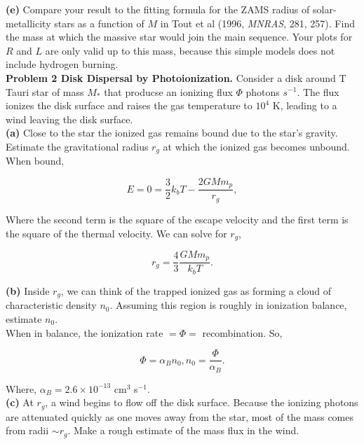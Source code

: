 \documentclass[12pt]{article}
\begin{document}
\noindent \textbf{(e)} Compare your result to the fitting formula for the ZAMS radius of solar-metallicity stars as a function of $M$ in Tout et al (1996, {\it MNRAS}, 281, 257). Find the mass at which the massive star would join the main sequence. Your plots for $R$ and $L$ are only valid up to this mass, because this simple models does not include hydrogen burning. \\


\noindent \textbf{Problem 2 Disk Dispersal by Photoionization.} Consider a disk around T Tauri star of mass $M_*$ that producse an ionizing flux $\Phi$ photons $s^{-1}$. The flux ionizes the disk surface and raises the gas temperature to $10^4$ K, leading to a wind leaving the disk surface.\\

\noindent \textbf{(a)} Close to the star the ionized gas remains bound due to the star's gravity. Estimate the gravitational radius $r_g$ at which the ionized gas becomes unbound. \\

\noindent When bound, 

\begin{equation}
E = 0 = \frac{3}{2}k_bT -\frac{2GMm_p}{r_g},
\end{equation}

\noindent Where the second term is the square of the escape velocity and the first term is the square of the thermal velocity. We can solve for $r_g$,

\begin{equation}
r_{g} = \frac{4}{3}\frac{GMm_p}{k_bT}.
\end{equation}

\noindent \textbf{(b)} Inside $r_g$, we can think of the trapped ionized gas as forming a cloud of characteristic density $n_0$. Assuming this region is roughly in ionization balance, estimate $n_0$. \\

\noindent When in balance, the ionization rate $ = \Phi = $ recombination. So,

\begin{equation}
\Phi = \alpha_B n_0, n_0 = \frac{\Phi}{\alpha_B}.
\end{equation}

\noindent Where, $\alpha_B = 2.6 \times 10^{-13}$ cm$^3$ s$^{-1}$. \\ 





\noindent \textbf{(c)} At $r_g$, a wind begins to flow off the disk surface. Because the ionizing photons are attenuated quickly as one moves away from the star,  most of the mass comes from radii $\sim  r_g$. Make a rough estimate of the mass flux in the wind. \\
\end{document}
